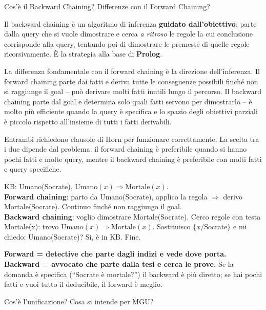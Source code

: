 \documentclass[12pt,a4paper]{article}
\begin{document}
\begin{domandabox}{Cos'è il Backward Chaining? Differenze con il Forward Chaining?}
\end{domandabox}

Il backward chaining è un algoritmo di inferenza \textbf{guidato dall'obiettivo}: parte dalla query che si vuole dimostrare e cerca \emph{a ritroso} le regole la cui conclusione corrisponde alla query, tentando poi di dimostrare le premesse di quelle regole ricorsivamente. È la strategia alla base di \textbf{Prolog}.

La differenza fondamentale con il forward chaining è la direzione dell'inferenza. Il forward chaining parte dai fatti e deriva tutte le conseguenze possibili finché non si raggiunge il goal -- può derivare molti fatti inutili lungo il percorso. Il backward chaining parte dal goal e determina solo quali fatti servono per dimostrarlo -- è molto più efficiente quando la query è specifica e lo spazio degli obiettivi parziali è piccolo rispetto all'insieme di tutti i fatti derivabili.

Entrambi richiedono clausole di Horn per funzionare correttamente. La scelta tra i due dipende dal problema: il forward chaining è preferibile quando si hanno pochi fatti e molte query, mentre il backward chaining è preferibile con molti fatti e query specifiche.

\begin{esempiobox}
KB: Umano(Socrate), $\text{Umano}(x) \Rightarrow \text{Mortale}(x)$.\\
\textbf{Forward chaining}: parto da Umano(Socrate), applico la regola $\Rightarrow$ derivo Mortale(Socrate). Continuo finché non raggiungo il goal.\\
\textbf{Backward chaining}: voglio dimostrare Mortale(Socrate). Cerco regole con testa Mortale(x): trovo $\text{Umano}(x) \Rightarrow \text{Mortale}(x)$. Sostituisco $\{x/\text{Socrate}\}$ e mi chiedo: Umano(Socrate)? Sì, è in KB. Fine.
\end{esempiobox}

\begin{ricordabox}
\textbf{Forward = detective che parte dagli indizi e vede dove porta.} \textbf{Backward = avvocato che parte dalla tesi e cerca le prove.} Se la domanda è specifica (``Socrate è mortale?'') il backward è più diretto; se hai pochi fatti e vuoi tutto il deducibile, il forward è meglio.
\end{ricordabox}

\begin{domandabox}{Cos'è l'unificazione? Cosa si intende per MGU?}
\end{domandabox}
\end{document}
